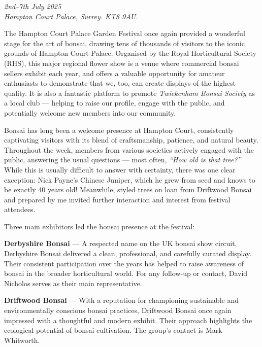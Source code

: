 \label{2025-07-show}
\noindent
\textit{2nd–7th July 2025} \\
\textit{Hampton Court Palace, Surrey. KT8 9AU.}

\medskip
The Hampton Court Palace Garden Festival once again provided a wonderful stage for the art of bonsai, drawing tens of thousands of visitors to the iconic grounds of Hampton Court Palace.
Organised by the Royal Horticultural Society (RHS), this major regional flower show is a venue where commercial bonsai sellers exhibit each year, and offers a valuable opportunity for amateur enthusiasts to demonstrate that we, too, can create displays of the highest quality.
It is also a fantastic platform to promote \emph{Twickenham Bonsai Society} as a local club --- helping to raise our profile, engage with the public, and potentially welcome new members into our community.

\medskip
Bonsai has long been a welcome presence at Hampton Court, consistently captivating visitors with its blend of craftsmanship, patience, and natural beauty.
Throughout the week, members from various societies actively engaged with the public, answering the usual questions --- most often, \emph{``How old is that tree?''}
While this is usually difficult to answer with certainty, there was one clear exception: Nick Payne's Chinese Juniper, which he grew from seed and knows to be exactly 40 years old!
Meanwhile, styled trees on loan from Driftwood Bonsai and prepared by me invited further interaction and interest from festival attendees.

\medskip
{}
\noindent
Three main exhibitors led the bonsai presence at the festival:

\medskip
\textbf{Derbyshire Bonsai} --- A respected name on the UK bonsai show circuit, Derbyshire Bonsai delivered a clean, professional, and carefully curated display.
Their consistent participation over the years has helped to raise awareness of bonsai in the broader horticultural world.
For any follow\--up or contact, David Nicholos serves as their main representative.

\medskip
\textbf{Driftwood Bonsai} --- With a reputation for championing sustainable and environmentally conscious bonsai practices, Driftwood Bonsai once again impressed with a thoughtful and modern exhibit.
Their approach highlights the ecological potential of bonsai cultivation.
The group's contact is Mark Whitworth.

